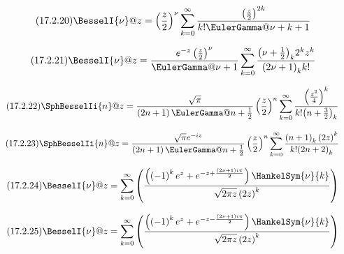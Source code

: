 \documentclass[11pt]{article}
\begin{document}
\begin{equation*}\tag{17.2.20}
  \BesselI{\nu}@{z}
  = \left(\frac{z}{2}\right)^{\nu} \sum_{k=0}^\infty \frac{\left(\frac{z}{2}\right)^{2k}}{k!\EulerGamma@{\nu+k+1}}
\end{equation*}

\begin{equation*}\tag{17.2.21}
  \BesselI{\nu}@{z}
  = \frac{e^{-z}\left(\frac{z}{2}\right)^{\nu}}{\EulerGamma@{\nu+1}} \sum_{k=0}^\infty \frac{\pochhammer{\nu+\frac{1}{2}}{k}2^{k}z^{k}}{\pochhammer{2\nu+1}{k}k!}
\end{equation*}

\begin{equation*}\tag{17.2.22}
  \SphBesselIi{n}@{z}
  = \frac{\sqrt{\pi}}{\left(2n+1\right)\EulerGamma@{n+\frac{1}{2}}}\left(\frac{z}{2}\right)^{n} \sum_{k=0}^\infty \frac{\left(\frac{z^{2}}{4}\right)^{k}}{k!\pochhammer{n+\frac{3}{2}}{k}}
\end{equation*}

\begin{equation*}\tag{17.2.23}
  \SphBesselIi{n}@{z}
  = \frac{\sqrt{\pi}e^{-i z}}{\left(2n+1\right)\EulerGamma@{n+\frac{1}{2}}}\left(\frac{z}{2}\right)^{n} \sum_{k=0}^\infty \frac{\pochhammer{n+1}{k}\left(2z\right)^{k}}{k!\pochhammer{2n+2}{k}}
\end{equation*}

\begin{equation*}\tag{17.2.24}
  \BesselI{\nu}@{z}
  =  \sum_{k=0}^\infty \left(\frac{\left(\left(-1\right)^{k}e^{z}+e^{-z+\frac{\left(2\nu+1\right)i\pi}{2}}\right)\HankelSym{\nu}{k}}{\sqrt{2\pi z}\left(2z\right)^{k}}\right)
\end{equation*}

\begin{equation*}\tag{17.2.25}
  \BesselI{\nu}@{z}
  =  \sum_{k=0}^\infty \left(\frac{\left(\left(-1\right)^{k}e^{z}+e^{-z-\frac{\left(2\nu+1\right)i\pi}{2}}\right)\HankelSym{\nu}{k}}{\sqrt{2\pi z}\left(2z\right)^{k}}\right)
\end{equation*}
\end{document}
